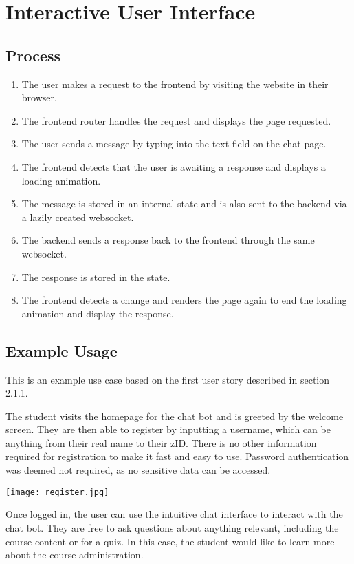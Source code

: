 \section{Interactive User Interface}
\subsection{Process}
\begin{enumerate}
    \item{The user makes a request to the frontend by visiting the website in their browser.}
    \item{The frontend router handles the request and displays the page requested.}
    \item{The user sends a message by typing into the text field on the chat page.}
    \item{The frontend detects that the user is awaiting a response and displays a loading animation.}
    \item{The message is stored in an internal  state and is also sent to the backend via a lazily created websocket.}
    \item{The backend sends a response back to the frontend through the same websocket.}
    \item{The response is stored in the  state.}
    \item{The frontend detects a change and renders the page again to end the loading animation and display the response.}
\end{enumerate}

\subsection{Example Usage}
This is an example use case based on the first user story described in section 2.1.1.

The student visits the homepage for the chat bot and is greeted by the welcome screen. They are then able to register by inputting a username, which can be anything from their real name to their zID. There is no other information required for registration to make it fast and easy to use. Password authentication was deemed not required, as no sensitive data can be accessed.

\begin{center}
    \texttt{[image: register.jpg]}
\end{center}

Once logged in, the user can use the intuitive chat interface to interact with the chat bot. They are free to ask questions about anything relevant, including the course content or for a quiz. In this case, the student would like to learn more about the course administration.

